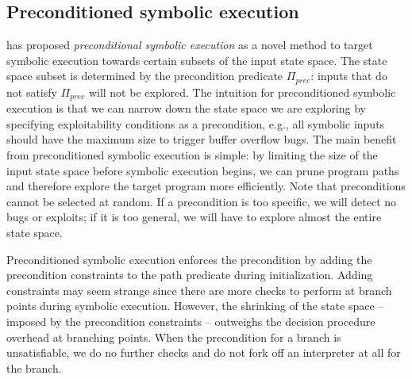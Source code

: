 \subsection{Preconditioned symbolic execution}
\label{precontioned-symbolic-execution}

\cite{AEG-NDSS11} has proposed {\em preconditional symbolic execution} as a novel method to target symbolic execution towards certain subsets of the input state space. The state space subset is determined by the precondition predicate $\Pi_{prec}$: inputs that do not satisfy $\Pi_{prec}$ will not be explored. The intuition for preconditioned symbolic execution is that we can narrow down the state space we are exploring by specifying exploitability conditions as a precondition, e.g., all symbolic inputs should have the maximum size to trigger buffer overflow bugs. The main benefit from preconditioned symbolic execution is simple: by limiting the size of the input state space before symbolic execution begins, we can prune program paths and therefore explore the target program more efficiently.
Note that preconditions cannot be selected at random. If a precondition is too specific, we will detect no bugs or exploits; if it is too general, we will have to explore almost the entire state space. %

Preconditioned symbolic execution enforces the precondition by adding the precondition constraints to the path predicate during initialization. Adding constraints may seem strange since there are more checks to perform at branch points during symbolic execution. However, the shrinking of the state space -- imposed by the precondition constraints -- outweighs the decision procedure overhead at branching points. When the precondition for a branch is unsatisfiable, we do no further checks and do not fork off an interpreter at all for the branch.%

